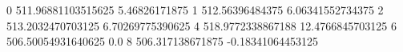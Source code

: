 0 511.96881103515625 5.46826171875
1 512.56396484375 6.06341552734375
2 513.2032470703125 6.70269775390625
4 518.9772338867188 12.4766845703125
6 506.50054931640625 0.0
8 506.317138671875 -0.18341064453125
